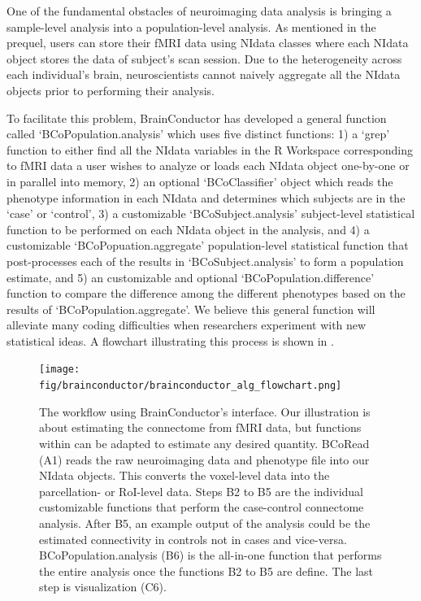 \documentclass{nature}
\begin{document}
One of the fundamental obstacles of neuroimaging data analysis is bringing a
sample-level
analysis into a population-level analysis. As mentioned in the prequel, users
can
store their fMRI data using NIdata classes where each NIdata object stores the
data of
subject's scan session. Due to the heterogeneity across each individual's brain,
neuroscientists cannot naively aggregate all the NIdata objects prior to
performing their
analysis.

To facilitate this problem, BrainConductor has developed a general function
called
`BCoPopulation.analysis' which uses five distinct functions: 1) a `grep'
function to either
find all the NIdata variables in the R Workspace corresponding to fMRI data a
user wishes
to analyze or loads each NIdata object one-by-one or in parallel into memory,
2) an optional `BCoClassifier' object which reads the phenotype information
in each NIdata and determines which subjects are in the `case' or `control', 3)
a customizable `BCoSubject.analysis' subject-level statistical function to be
performed on each NIdata object in the
analysis, and 4) a customizable `BCoPopuation.aggregate' population-level
statistical function
that post-processes each of the results in `BCoSubject.analysis' to form a
population
estimate, and 5) an customizable and optional `BCoPopulation.difference'
function
to compare the difference among the different phenotypes based on the
results of `BCoPopulation.aggregate'. We believe this general
function will alleviate many coding difficulties when researchers experiment
with
new statistical ideas. A flowchart illustrating this process is shown in
.

\begin{figure}[tb]
\centering
\texttt{[image: fig/brainconductor/brainconductor\_alg\_flowchart.png]}
\caption{The workflow using BrainConductor's interface. Our illustration
is about estimating the connectome from fMRI data, but functions within can be
adapted to estimate any desired quantity. BCoRead (A1) reads the
raw neuroimaging
data and phenotype file into our NIdata objects. This
converts the voxel-level data into the parcellation- or RoI-level
data. Steps B2 to B5 are the individual
customizable functions that perform the case-control connectome analysis.
After B5, an example output of the analysis could be
the estimated connectivity in controls not in cases and vice-versa.
 BCoPopulation.analysis (B6) is the all-in-one function that performs the entire
analysis
once the functions B2 to B5 are define. The last step is visualization (C6).}
\label{fig:flowchart}
\end{figure}
\end{document}
